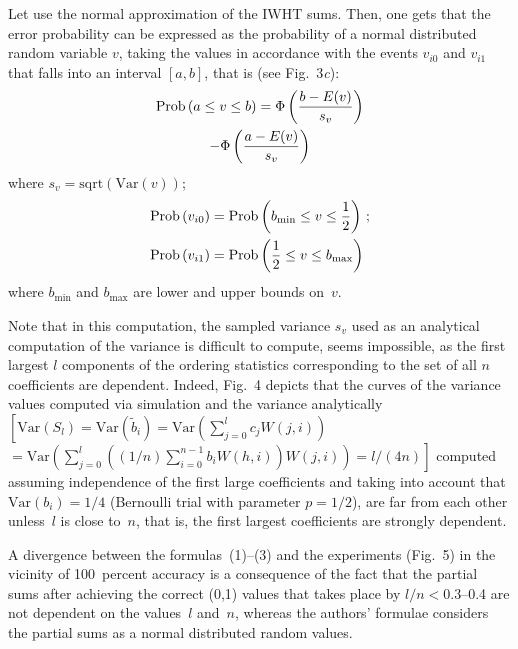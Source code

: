 \begin{multicols}{2}
Let use the normal approximation of the IWHT sums. Then, one gets that the error
probability can be expressed as the probability of a normal
distributed random variable $v$, taking the values in accordance
with the events $v_{i0}$ and $v_{i1}$ that falls into an interval
$[a,b]$, that is (see Fig.~3\textit{c}):
\begin{multline}
\mathrm{Prob}\left(a \le v \le b\right)=\Phi\left(\displaystyle\frac{\displaystyle b-E(v)\mathstrut}{\displaystyle s_v\mathstrut}\right)\\
-\Phi\left(\displaystyle\frac{\displaystyle a-E(v)\mathstrut}{\displaystyle s_v\mathstrut}\right) 
\label{e1-fr}
\end{multline}
where $s_v=\mathrm{sqrt}\left(\mathrm{Var}\left(v\right)\right)$;
\begin{align}
\mathrm{Prob}\left(v_{i0}\right) &= \mathrm{Prob}\left(b_{\min} \le v\le \displaystyle\frac{\displaystyle 1\mathstrut}{\displaystyle 2\mathstrut}\right)\,;
 \label{e2-fr}
\\
\mathrm{Prob}\left(v_{i1}\right) &= \mathrm{Prob}\left(\displaystyle\frac{\displaystyle 1\mathstrut}{\displaystyle 2\mathstrut} \le v\le b_{\max}\right) \label{e3-fr}
\end{align}
where $b_{\min}$ and $b_{\max}$ are lower and upper bounds on~$v$.


Note that in this computation,  the sampled variance $s_v$
used as an analytical computation of the variance is difficult to compute, seems impossible, 
as the first  largest $l$ components of the ordering statistics corresponding 
to the set of all $n$ coefficients are dependent.
 Indeed, Fig.~4 depicts that the curves of the variance values computed 
 via simulation  and the variance analytically  
 $\left[\mathrm{Var}\left(S_l\right) = \mathrm{Var}\left(\tilde b_i\right) 
 = \mathrm{Var}\left(\sum\limits_{j=0}^{l} 
 c_j W(j,i)\right)\right.$\linebreak $\left.= \mathrm{Var}
 \left(\sum\limits_{j=0}^{l} ((1/n) \sum\limits_{i=0}^{n-1} b_i W(h,i)) W(j,i)\right)= 
 l/(4n)\right]$ computed assuming independence of the first large coefficients 
 and taking  into account 
 that $\mathrm{Var}\left(b_i\right)=1/4 $ (Bernoulli trial with parameter $p=1/2$), are far from each other 
 unless~$l$ is close to~$n$, that is, the first largest coefficients are strongly dependent.

 A divergence between the formulas~(1)--(3) and the experiments (Fig.~5) 
 in the vicinity of 100~percent  accuracy is  a consequence of the fact that the partial 
 sums after achieving the correct (0,1) values that takes place by $l/n< 0.3$--0.4 
 are not dependent on the values~$l$ and~$n$, whereas the authors'
 formulae considers the partial   sums as a normal distributed random values.


\end{multicols}
